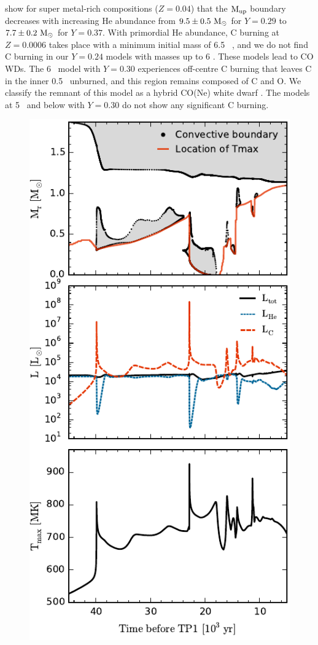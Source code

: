 \citet{Bono:2000gk} show for super metal-rich compositions ($Z=0.04$) that the $\mathrm{M}_\mathrm{up}$ boundary decreases with increasing He abundance from $9.5 \pm 0.5\ \mathrm{M}_{\odot}$ for $Y=0.29$ to $7.7 \pm 0.2\ \mathrm{M}_{\odot}$ for $Y=0.37$. With primordial He abundance, C burning at $Z=0.0006$ takes place with a minimum initial mass of 6.5 \Msun\ \citep{Doherty:2015ek}, and we do not find C burning in our $Y=0.24$ models with masses up to 6 \Msun. These models lead to CO WDs. The 6 \Msun\ model with $Y=0.30$ experiences off-centre C burning that leaves C in the inner 0.5 \Msun\ unburned, and this region remains composed of C and O. We classify the remnant of this model as a hybrid CO(Ne) white dwarf \citep{Doherty:2015ek}. The models at 5 \Msun\ and below with $Y=0.30$ do not show any significant C burning.

\begin{figure}
 \begin{center}\includegraphics[height=0.82\textheight]{fig-cburning.pdf}\end{center}

\end{figure}
